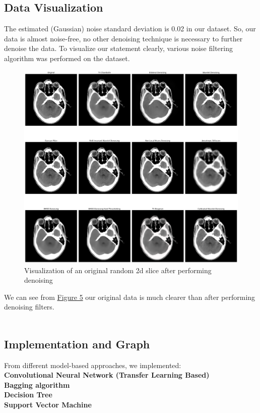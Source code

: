 \documentclass[sigconf]{acmart}
\begin{document}
\subsection{Data Visualization}
The estimated (Gaussian) noise standard deviation is 0.02 in our dataset. So, our data is almost noise-free, no other denoising technique is necessary to further denoise the data. To visualize our statement clearly, various noise filtering algorithm was performed on the dataset.
\begin{figure}[h]
  \centering
   
  \includegraphics[width=\linewidth]{../supplements/4. Noise with Visualize.png}
 
\caption{Visualization of an original random 2d slice after performing denoising}
  \label{Fig.5}
\end{figure}

We can see from \hyperref[Fig.5]{Figure 5} our original data is much clearer than after performing denoising filters.
\\
\\
\subsection{Implementation and Graph}
From different model-based approaches, we implemented:\\
\textbf{Convolutional Neural Network (Transfer Learning Based)}\\
\textbf{Bagging algorithm}\\
\textbf{Decision Tree}\\
\textbf{Support Vector Machine}\\
\end{document}
